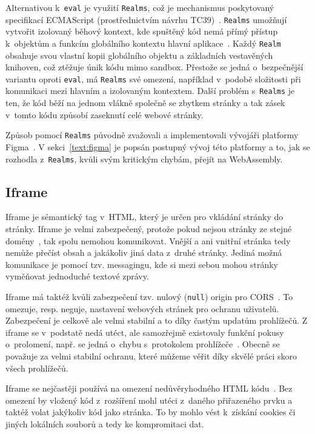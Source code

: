 Alternativou k~\texttt{eval} je využití \texttt{Realms}, což je mechanismus poskytovaný specifikací ECMAScript (prostřednictvím návrhu TC39)~\cite{shadowrealms_propsal}. 
\texttt{Realms} umožňují vytvořit izolovaný běhový kontext, kde spuštěný kód nemá přímý přístup k~objektům a funkcím globálního kontextu hlavní aplikace~\cite{shadowrealms_propsal, shadowrealms}.
Každý \texttt{Realm} obsahuje svou vlastní kopii globálního objektu a základních vestavěných knihoven, což ztěžuje únik kódu mimo sandbox.
Přestože se jedná o~bezpečnější variantu oproti \texttt{eval}, má \texttt{Realms} své omezení, například v~podobě složitosti při komunikaci mezi hlavním a izolovaným kontextem. 
Další problém s~\texttt{Realms} je ten, že kód běží na jednom vlákně společně se zbytkem stránky a tak zásek v~tomto kódu způsobí zaseknutí celé webové stránky.

Způsob pomocí \texttt{Realms} původně zvažovali a implementovali vývojáři platformy Figma~\cite{figma_plugins_blog}.
V sekci~\ref{text:figma} je popsán postupný vývoj této platformy a to, jak se rozhodla z~\texttt{Realms}, kvůli svým kritickým chybám, přejít na WebAssembly.

\subsection{Iframe}

Iframe je sémantický tag v~HTML, který je určen pro vkládání stránky do stránky.
Iframe je velmi zabezpečený, protože pokud nejsou stránky ze stejné domény~\cite{iframe, figma_plugins_blog}, tak spolu nemohou komunikovat.
Vnější a ani vnitřní stránka tedy nemůže přečíst obsah a jakákoliv jiná data z~druhé stránky.
Jediná možná komunikace je pomocí tzv. messagingu, kde si mezi sebou mohou stránky vyměňovat jednoduché textové zprávy.

Iframe má taktéž kvůli zabezpečení tzv. nulový (\texttt{null}) origin pro CORS~\cite{iframe, figma_plugins_blog}.
To omezuje, resp. neguje, nastavení webových stránek pro ochranu uživatelů.
Zabezpečení je celkově ale velmi stabilní a to díky častým updatům prohlížečů.
Z iframe se v~podstatě nedá utéct, ale samozřejmě existovaly funkční pokusy o~prolomení, např. se jedná o~chybu s~protokolem prohlížeče~\cite{iframe_vuln}.
Obecně se považuje za velmi stabilní ochranu, které můžeme věřit díky skvělé práci skoro všech prohlížečů.

Iframe se nejčastěji používá na omezení nedůvěryhodného HTML kódu~\cite{iframe}.
Bez omezení by vložený kód z~rozšíření mohl utéci z~daného přiřazeného prvku a taktéž volat jakýkoliv kód jako stránka.
To by mohlo vést k~získání cookies či jiných lokálních souborů a tedy ke kompromitaci dat.

